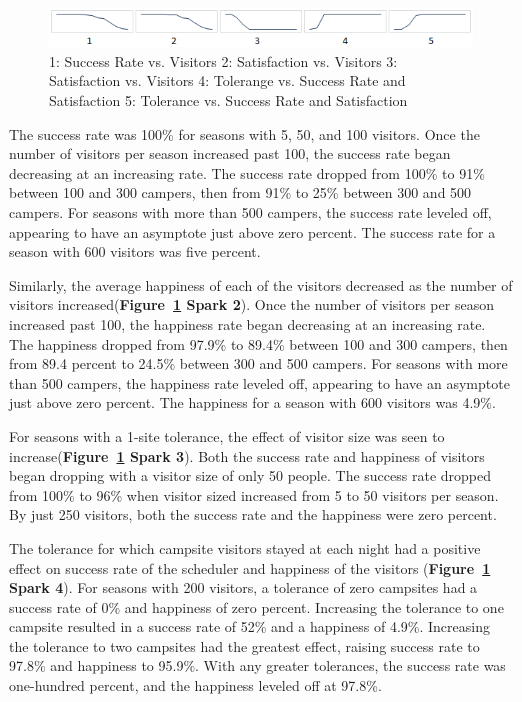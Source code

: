 \documentclass[11pt]{article} %
\begin{document}
\begin{figure}[b]
  \centering
  \includegraphics[scale=.9]{imgs/sparklines.png}
  \caption{1: Success Rate vs. Visitors 2: Satisfaction
    vs. Visitors 3: Satisfaction vs. Visitors
    4: Tolerange vs. Success Rate and Satisfaction 5: Tolerance vs. Success Rate and Satisfaction}
  \label{fig:sparklines}
\end{figure}

The success rate was 100\% for seasons with 5, 50, and 100
visitors. Once the number of visitors per season increased past 100, the
success rate began decreasing at an increasing rate. The success rate
dropped from 100\% to 91\% between 100 and 300 campers, then
from 91\% to 25\% between 300 and 500 campers. For seasons with
more than 500 campers, the success rate leveled off, appearing to have an
asymptote just above zero percent. The success rate for a season with 600
visitors was five percent.

Similarly, the average happiness of each of the visitors decreased as the
number of visitors increased(\textbf{Figure~\ref{fig:sparklines} Spark 2}).
Once the number of visitors per season increased past 100, the
happiness rate began decreasing at an increasing rate. The happiness dropped
from 97.9\% to 89.4\% between 100 and 300 campers, then from 89.4
percent to 24.5\% between 300 and 500 campers. For seasons with more
than 500 campers, the happiness rate leveled off, appearing to have an
asymptote just above zero percent. The happiness for a season with 600 visitors
was 4.9\%.

For seasons with a  1-site tolerance, the effect of visitor size was seen to
increase(\textbf{Figure~\ref{fig:sparklines} Spark 3}). Both the
success rate and happiness of visitors began dropping with a visitor size of
only 50 people. The success rate dropped from 100\% to 96\%
when visitor sized increased from 5 to 50 visitors per season. By just 250
visitors, both the success rate and the happiness were zero percent.

The tolerance for which campsite visitors stayed at each night had a positive
effect on success rate of the scheduler and happiness of the visitors
(\textbf{Figure~\ref{fig:sparklines} Spark 4}).  For seasons with
200 visitors, a tolerance of zero campsites had a success rate of 0\%
and happiness of zero percent. Increasing the tolerance to one campsite
resulted in a success rate of 52\% and a happiness of 4.9\%.
Increasing the tolerance to two campsites had the greatest effect, raising
success rate to 97.8\% and happiness to 95.9\%. With any greater
tolerances, the success rate was one-hundred percent, and the happiness
leveled off at 97.8\%.
\end{document}
